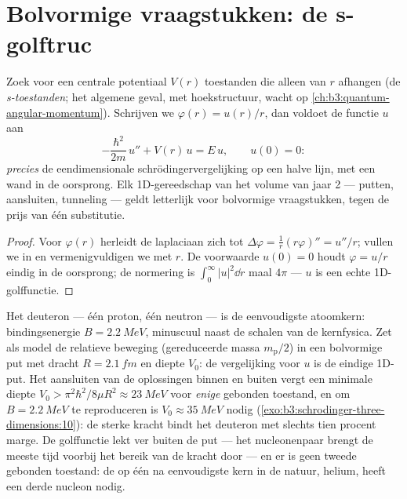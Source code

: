\section{Bolvormige vraagstukken: de s-golftruc}

\begin{proposition}\label{prop:b3:schrodinger-three-dimensions:swave}
Zoek voor een centrale potentiaal $V(r)$ toestanden die alleen van $r$
afhangen (de \emph{s-toestanden}; het algemene geval, met hoekstructuur,
wacht op \cref{ch:b3:quantum-angular-momentum}). Schrijven we $\varphi(r) = u(r)/r$, dan voldoet de functie $u$ aan
\[
-\frac{\hbar^2}{2m}\,u'' + V(r)\,u = E\,u ,
\qquad u(0) = 0 :
\]
\emph{precies} de eendimensionale schrödingervergelijking op een halve
lijn, met een wand in de oorsprong. Elk 1D-gereedschap van het volume van
jaar 2 --- putten, aansluiten, tunneling --- geldt letterlijk voor
bolvormige vraagstukken, tegen de prijs van één substitutie.
\end{proposition}

\begin{proof}
Voor $\varphi(r)$ herleidt de laplaciaan zich tot $\Delta\varphi =
\tfrac1r(r\varphi)'' = u''/r$; vullen we in en vermenigvuldigen we met
$r$. De voorwaarde $u(0) = 0$ houdt $\varphi = u/r$ eindig in de
oorsprong; de normering is $\int_0^\infty|u|^2\dd r$ maal $4\pi$ --- $u$
is een echte 1D-golffunctie.
\end{proof}

\begin{example}\label{ex:b3:schrodinger-three-dimensions:deuteron}
Het deuteron --- één proton, één neutron --- is de eenvoudigste
atoomkern: bindingsenergie $B = \qty{2.2}{MeV}$, minuscuul naast de
schalen van de kernfysica. Zet als model de relatieve beweging
(gereduceerde massa $m_{\text{p}}/2$) in een bolvormige put met
dracht $R = \qty{2.1}{fm}$ en diepte $V_0$: de vergelijking voor $u$ is
de eindige 1D-put. Het aansluiten van de oplossingen binnen en buiten
vergt een minimale diepte $V_0 > \pi^2\hbar^2/8\mu R^2
\approx \qty{23}{MeV}$ voor \emph{enige} gebonden toestand, en om $B = \qty{2.2}{MeV}$ te reproduceren is $V_0 \approx \qty{35}{MeV}$ nodig
(\cref{exo:b3:schrodinger-three-dimensions:10}): de sterke kracht bindt
het deuteron met slechts tien procent marge. De golffunctie lekt ver
buiten de put --- het nucleonenpaar brengt de meeste tijd voorbij het
bereik van de kracht door --- en er is geen tweede gebonden toestand: de
op één na eenvoudigste kern in de natuur, helium, heeft een derde nucleon
nodig.
\end{example}

